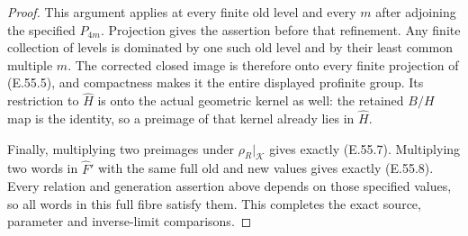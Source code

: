 \begin{proof}
This argument applies at every finite
old level and every $m$ after adjoining
the specified $P_{4m}$. Projection gives
the assertion before that refinement.
Any finite collection of levels is
dominated by one such old level and by
their least common multiple $m$.
The corrected closed image is therefore
onto every finite projection of
\textup{(E.55.5)}, and compactness makes
it the entire displayed profinite group.
Its restriction to $\widehat H$ is onto
the actual geometric kernel as well:
the retained $B/H$ map is the identity,
so a preimage of that kernel already
lies in $\widehat H$.

Finally, multiplying two preimages
under $\rho_R|_{\mathscr K}$ gives
exactly \textup{(E.55.7)}. Multiplying
two words in $\widehat F'$ with the
same full old and new values gives
exactly \textup{(E.55.8)}.
Every relation and generation assertion
above depends on those specified values,
so all words in this full fibre satisfy
them. This completes the exact source,
parameter and inverse-limit comparisons.
\end{proof}
